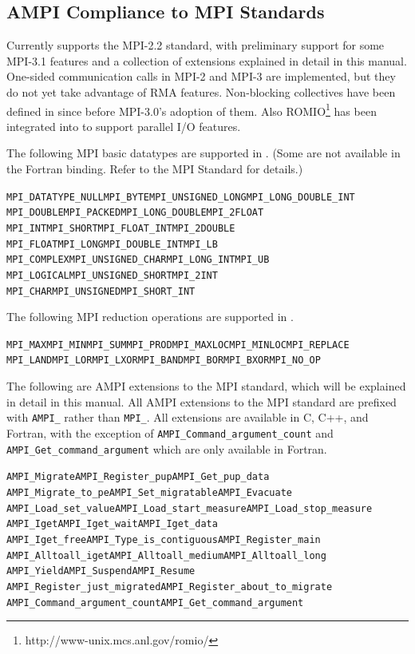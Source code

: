 \documentclass[10pt]{article}
\begin{document}
\subsection{AMPI Compliance to MPI Standards}

Currently \ampi{} supports the MPI-2.2 standard, with preliminary support for some MPI-3.1
features and a collection of extensions explained in detail in this manual. One-sided
communication calls in MPI-2 and MPI-3 are implemented, but they do not yet
take advantage of RMA features. Non-blocking collectives have been defined in
\ampi{} since before MPI-3.0's adoption of them. Also
ROMIO\footnote{http://www-unix.mcs.anl.gov/romio/} has been integrated into
\ampi{} to support parallel I/O features.

The following MPI basic datatypes are supported in \ampi{}. (Some are not
available in the Fortran binding. Refer to the MPI Standard for details.)
\begin{alltt}
MPI_DATATYPE_NULL  MPI_BYTE            MPI_UNSIGNED_LONG MPI_LONG_DOUBLE_INT
MPI_DOUBLE         MPI_PACKED          MPI_LONG_DOUBLE   MPI_2FLOAT
MPI_INT            MPI_SHORT           MPI_FLOAT_INT     MPI_2DOUBLE
MPI_FLOAT          MPI_LONG            MPI_DOUBLE_INT    MPI_LB
MPI_COMPLEX        MPI_UNSIGNED_CHAR   MPI_LONG_INT      MPI_UB
MPI_LOGICAL        MPI_UNSIGNED_SHORT  MPI_2INT
MPI_CHAR           MPI_UNSIGNED        MPI_SHORT_INT
\end{alltt}

The following MPI reduction operations are supported in \ampi{}.

\begin{alltt}
MPI_MAX   MPI_MIN   MPI_SUM   MPI_PROD  MPI_MAXLOC  MPI_MINLOC  MPI_REPLACE
MPI_LAND  MPI_LOR   MPI_LXOR  MPI_BAND  MPI_BOR     MPI_BXOR    MPI_NO_OP
\end{alltt}

The following are AMPI extensions to the MPI standard, which will be explained in
detail in this manual. All AMPI extensions to the MPI standard are prefixed with
\texttt{AMPI\_} rather than \texttt{MPI\_}. All extensions are available in C, C++, and Fortran,
with the exception of \texttt{AMPI\_Command\_argument\_count} and
\texttt{AMPI\_Get\_command\_argument} which are only available in Fortran.

\begin{alltt}
AMPI_Migrate          AMPI_Register_pup            AMPI_Get_pup_data
AMPI_Migrate_to_pe    AMPI_Set_migratable          AMPI_Evacuate
AMPI_Load_set_value   AMPI_Load_start_measure      AMPI_Load_stop_measure
AMPI_Iget             AMPI_Iget_wait               AMPI_Iget_data
AMPI_Iget_free        AMPI_Type_is_contiguous      AMPI_Register_main
AMPI_Alltoall_iget    AMPI_Alltoall_medium         AMPI_Alltoall_long
AMPI_Yield            AMPI_Suspend                 AMPI_Resume
AMPI_Register_just_migrated         AMPI_Register_about_to_migrate
AMPI_Command_argument_count         AMPI_Get_command_argument
\end{alltt}
\end{document}
